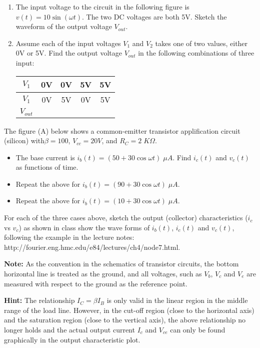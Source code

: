 \begin{enumerate}

\item The input voltage to the circuit in the following figure is
$v(t)=10 \sin (\omega t)$. The two DC voltages are both 5V. Sketch the
waveform of the output voltage $V_{out}$.


\item Assume each of the input voltages $V_1$ and $V_2$ takes one of
two values, either 0V or 5V. Find the output voltage $V_{out}$ in the
following combinations of three input:
 
\begin{tabular}{c||c c c c}\hline\hline
$V_1$ & 0V & 0V & 5V & 5V \\ \hline
$V_1$ & 0V & 5V & 0V & 5V \\ \hline
$V_{out}$ &   &   &   &   \\
\end{tabular}



\end{enumerate}




\item The figure (A) below shows a common-emitter transistor 
applification circuit (silicon) with$\beta=100$, $V_{cc}=20V$, 
and $R_C=2\;K\Omega$. 
\begin{itemize}
\item The base current is $i_b(t)=(50+30 \cos \omega t)\;\mu A$.
Find $i_c(t)$ and $v_c(t)$ as functions of time.
\item Repeat the above for $i_b(t)=(90+30 \cos \omega t)\;\mu A$.
\item Repeat the above for $i_b(t)=(10+30 \cos \omega t)\;\mu A$.
\end{itemize}
For each of the three cases above, sketch the output (collector) 
characteristics ($i_c$ vs $v_c$) as shown in class show the wave
forms of $i_b(t)$, $i_c(t)$ and $v_c(t)$, following the example
in the lecture notes:
http://fourier.eng.hmc.edu/e84/lectures/ch4/node7.html.

{\bf Note:} As the convention in the schematics of transistor circuits,
the bottom horizontal line is treated as the ground, and all voltages,
such as $V_b$, $V_c$ and $V_e$ are measured with respect to the 
ground as the reference point.

{\bf Hint:} The relationship $I_C=\beta I_B$ is only valid in the
linear region in the middle range of the load line. However, in 
the cut-off region (close to the horizontal axis) and the saturation
region (close to the vertical axis), the above relationship no
longer holds and the actual output current $I_c$ and $V_{ce}$ can
only be found graphically in the output characteristic plot.

